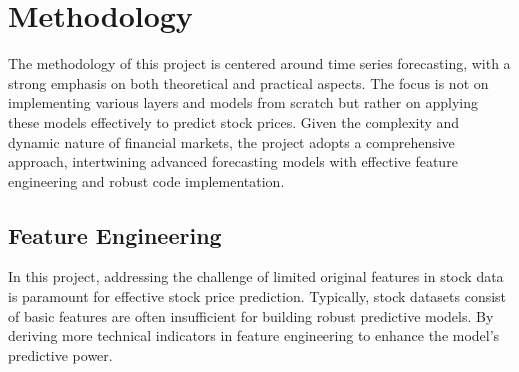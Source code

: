 \documentclass[10pt,twocolumn,letterpaper]{article}
\begin{document}
\section{Methodology}
\label{sec:method}
The methodology of this project is centered around time series forecasting, with a strong emphasis on both theoretical and practical aspects.
The focus is not on implementing various layers and models from scratch but rather on applying these models effectively to predict stock prices.
Given the complexity and dynamic nature of financial markets, the project adopts a comprehensive approach, intertwining advanced forecasting models with effective feature engineering and robust code implementation.
\subsection{Feature Engineering}
\label{sec:fe}
In this project, addressing the challenge of limited original features in stock data is paramount for effective stock price prediction.
Typically, stock datasets consist of basic features are often insufficient for building robust predictive models.
By deriving more technical indicators in feature engineering to enhance the model's predictive power.
\end{document}
